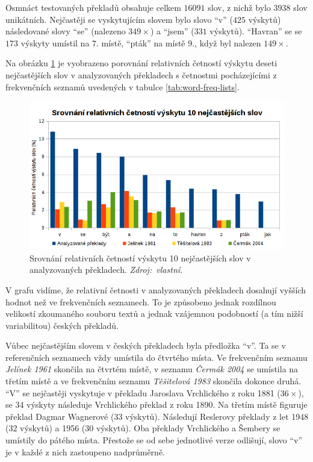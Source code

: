 \documentclass[dp.tex]{subfiles}
\begin{document}
Osmnáct testovaných překladů obsahuje celkem $16 091$ slov, z nichž bylo $3938$ slov unikátních. Nejčastěji se vyskytujícím slovem bylo slovo \enquote{v} ($425$ výskytů) následované slovy \enquote{se} (nalezeno $349\times$) a \enquote{jsem} ($331$ výskytů). \enquote{Havran} se se $173$ výskyty umístil na $7.$ místě, \enquote{pták} na místě $9.$, když byl nalezen $149\times$.

Na obrázku \ref{fig:word-freq} je vyobrazeno porovnání relativních četností výskytu deseti nejčastějších slov v analyzovaných překladech s četnostmi pocházejícími z frekvenčních seznamů uvedených v tabulce \ref{tab:word-freq-lists}.

\begin{figure}[h!]
	\centering
	\includegraphics[max width=\textwidth,keepaspectratio=true]{imgs-70-prakticka/cetnost-slov}
	\caption[Srovnání relativních četností výskytu 10 nejčastějších slov v analyzovaných překladech.]{Srovnání relativních četností výskytu 10 nejčastějších slov v analyzovaných překladech. \textit{Zdroj:~vlastní.}}
	\label{fig:word-freq}
\end{figure}

V grafu vidíme, že relativní četnosti v analyzovaných překladech dosahují vyšších hodnot než ve frekvenčních seznamech. To je způsobeno jednak rozdílnou velikostí zkoumaného souboru textů a jednak vzájemnou podobností (a tím nižší variabilitou) českých překladů. 

Vůbec nejčastějším slovem v českých překladech byla předložka \enquote{v}. Ta se v referenčních seznamech vždy umístila do čtvrtého místa. Ve frekvenčním seznamu \textit{Jelínek 1961} skončila na čtvrtém místě, v seznamu \textit{Čermák 2004} se umístila na třetím místě a ve frekvenčním seznamu \textit{Těšitelová 1983} skončila dokonce druhá. \enquote{V} se nejčastěji vyskytuje v překladu Jaroslava Vrchlického z roku 1881 ($36\times$), se $34$ výskyty následuje Vrchlického překlad z roku 1890. Na třetím místě figuruje překlad Dagmar Wagnerové ($33$ výskytů). Následují Reslerovy překlady z let 1948 ($32$ výskytů) a 1956 ($30$ výskytů). Oba překlady Vrchlického a Šembery se umístily do pátého místa. Přestože se od sebe jednotlivé verze odlišují, slovo \enquote{v} je v každé z nich zastoupeno nadprůměrně.
\end{document}
